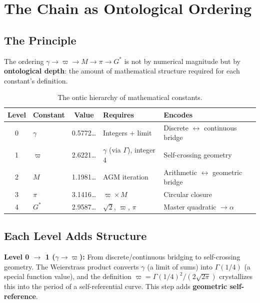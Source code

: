 \documentclass[11pt, letterpaper]{article}
\newcommand{\G}{G^*}
\theoremstyle{definition}
\theoremstyle{remark}
\begin{document}
\section{The Chain as Ontological Ordering}

\subsection{The Principle}

The ordering $\gamma \to \varpi \to M \to \pi \to \G$ is not by numerical magnitude but by \textbf{ontological depth}: the amount of mathematical structure required for each constant's definition.

\begin{table}[h]
\centering
\begin{tabular}{@{}clcll@{}}
\toprule
\textbf{Level} & \textbf{Constant} & \textbf{Value} & \textbf{Requires} & \textbf{Encodes} \\
\midrule
0 & $\gamma$ & 0.5772\ldots & Integers + limit & Discrete $\leftrightarrow$ continuous bridge \\
1 & $\varpi$ & 2.6221\ldots & $\gamma$ (via $\Gamma$), integer 4 & Self-crossing geometry \\
2 & $M$ & 1.1981\ldots & AGM iteration & Arithmetic $\leftrightarrow$ geometric bridge \\
3 & $\pi$ & 3.1416\ldots & $\varpi \times M$ & Circular closure \\
4 & $\G$ & 2.9587\ldots & $\sqrt{2}$, $\varpi$, $\pi$ & Master quadratic $\to \alpha$ \\
\bottomrule
\end{tabular}
\caption{The ontic hierarchy of mathematical constants.}
\end{table}

\subsection{Each Level Adds Structure}

\textbf{Level 0 $\to$ 1 ($\gamma \to \varpi$):} From discrete/continuous bridging to self-crossing geometry. The Weierstrass product converts $\gamma$ (a limit of sums) into $\Gamma(1/4)$ (a special function value), and the definition $\varpi = \Gamma(1/4)^2/(2\sqrt{2\pi})$ crystallizes this into the period of a self-referential curve. This step adds \textbf{geometric self-reference}.
\end{document}
